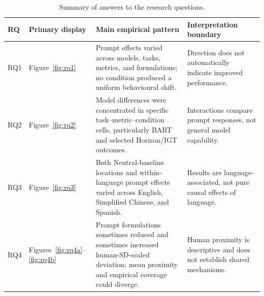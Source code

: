 \begin{table}[htbp]
\centering
\caption{Summary of answers to the research questions.}
\label{tab:rq_summary}
\begin{tabularx}{\textwidth}{p{1.0cm}p{3.2cm}Xp{3.8cm}}
\toprule
RQ & Primary display & Main empirical pattern & Interpretation boundary \\
\midrule
RQ1 & Figure~\ref{fig:rq1} & Prompt effects varied across models, tasks, metrics, and formulations; no condition produced a uniform behavioural shift. & Direction does not automatically indicate improved performance. \\
RQ2 & Figure~\ref{fig:rq2} & Model differences were concentrated in specific task--metric--condition cells, particularly BART and selected Horizon/IGT outcomes. & Interactions compare prompt responses, not general model capability. \\
RQ3 & Figure~\ref{fig:rq3} & Both Neutral-baseline locations and within-language prompt effects varied across English, Simplified Chinese, and Spanish. & Results are language-associated, not pure causal effects of language. \\
RQ4 & Figures~\ref{fig:rq4a}--\ref{fig:rq4b} & Prompt formulations sometimes reduced and sometimes increased human-SD-scaled deviation; mean proximity and empirical coverage could diverge. & Human proximity is descriptive and does not establish shared mechanisms. \\
\bottomrule
\end{tabularx}
\end{table}

